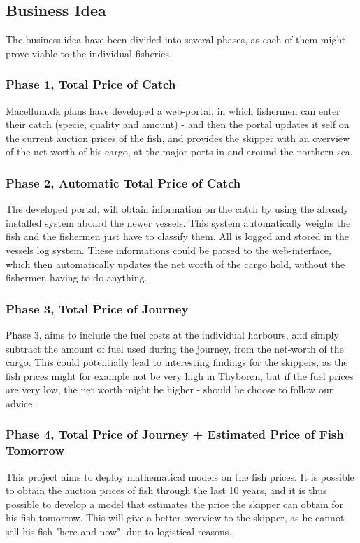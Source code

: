 \documentclass[a4paper,10pt,oneside,fleqn]{article}
\begin{document}
\subsection{Business Idea}
The business idea have been divided into several phases, as each of them might prove viable to the individual fisheries.

\subsubsection{Phase 1, Total Price of Catch}
Macellum.dk plans have developed a web-portal, in which fishermen can enter their catch (specie, quality and amount) - and then the portal updates it self on the current auction prices of the fish, and provides the skipper with an overview of the net-worth of his cargo, at the major ports in and around the northern sea. 

\subsubsection{Phase 2, Automatic Total Price of Catch}
The developed portal, will obtain information on the catch by using the already installed system aboard the newer vessels. This system automatically weighs the fish and the fishermen just have to classify them. All is logged and stored in the vessels log system. These informations could be parsed to the web-interface, which then automatically updates the net worth of the cargo hold, without the fishermen having to do anything. 

\subsubsection{Phase 3, Total Price of Journey}
Phase 3, aims to include the fuel costs at the individual harbours, and simply subtract the amount of fuel used during the journey, from the net-worth of the cargo. This could potentially lead to interesting findings for the skippers, as the fish prices might for example not be very high in Thyborøn, but if the fuel prices are very low, the net worth might be higher - should he choose to follow our advice. 

\subsubsection{Phase 4, Total Price of Journey + Estimated Price of Fish Tomorrow}
This project aims to deploy mathematical models on the fish prices. It is possible to obtain the auction prices of fish through the last 10 years, and it is thus possible to develop a model that estimates the price the skipper can obtain for his fish tomorrow. This will give a better overview to the skipper, as he cannot sell his fish "here and now", due to logistical reasons. 
\end{document}
